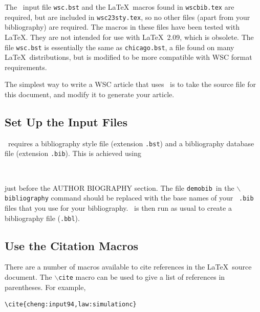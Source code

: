 \documentclass{wscpaperproc}
\theoremstyle{wsc}
\begin{document}
The \BibTeX\ input file {\tt wsc.bst} and the \LaTeX\ macros found in {\tt wscbib.tex} are required, but are included in {\tt wsc23sty.tex}, so no other files (apart from your bibliography) are required.
The macros in these files have been tested with \LaTeX. They are not intended for use with \LaTeX\ 2.09, which is obsolete.
The file {\tt wsc.bst} is essentially the same as {\tt chicago.bst}, a file found on many \LaTeX\ distributions, but is
modified to be more compatible with WSC format requirements.

The simplest way to write a WSC article that uses \BibTeX\ is to take the source file for this document, and modify it to generate your article. %

\subsection{Set Up the \texorpdfstring{\BibTeX}{BibTex} Input Files}

\BibTeX\ requires a bibliography style file (extension \texttt{.bst}) and a bibliography database file (extension \texttt{.bib}). This is achieved
using\newline


\begin{verbatim}


\end{verbatim}\vspace{5mm}

\noindent just before the AUTHOR BIOGRAPHY section. The file {\tt demobib}\ in the {\tt $\backslash$bibliography} command should be replaced with the base names of your \BibTeX\ {\tt *.bib} files that you use for your bibliography. \BibTeX\ is then run as usual to create a bibliography file ({\tt *.bbl}).

\subsection{Use the Citation Macros}
There are a number of macros available to cite references in the \LaTeX\ source document. The {\tt $\backslash$cite} macro can be used to give a list of references in parentheses. For example,\newline

\begin{verbatim}
\cite{cheng:input94,law:simulationc}
\end{verbatim}\vspace{5mm}
\end{document}
